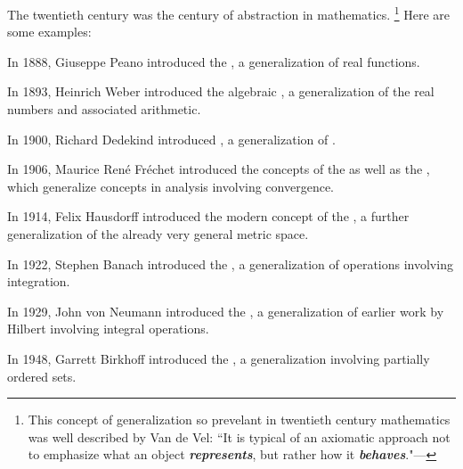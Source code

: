 The twentieth century was the century of abstraction in mathematics.%
\footnote{This concept of generalization so prevelant in
twentieth century mathematics was well described by Van de Vel:
``It is typical of an axiomatic approach not to emphasize what an object \emph{\bf represents},
but rather how it \emph{\bf behaves}."---
}
Here are some examples:
\begin{liste}
  \item In 1888, Giuseppe Peano introduced the ,
        a generalization of real functions.

  \item In 1893, Heinrich Weber introduced the algebraic ,
        a generalization of the real numbers and associated arithmetic.

  \item In 1900, Richard Dedekind introduced , a generalization of
        .

  \item In 1906, Maurice Ren\'e Fr\'echet
        introduced the concepts of the  as well as the
        , which generalize concepts in analysis involving
        convergence.

  \item In 1914, Felix Hausdorff introduced the modern concept of the
        , a further generalization of the
        already very general metric space.

  \item In 1922, Stephen Banach introduced the ,
        a generalization of operations involving integration.

  \item In 1929, John von Neumann introduced the , a
        generalization of earlier work by Hilbert involving integral operations.

  \item In 1948, Garrett Birkhoff introduced the ,
        a generalization involving partially ordered sets.
\end{liste}

